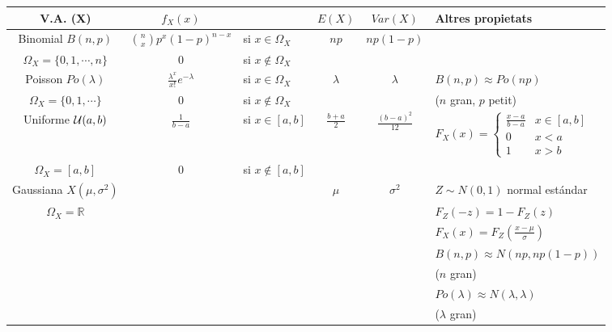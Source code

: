 \documentclass[a4paper,10pt]{article}
\begin{document}
\begin{tabular}{|c|cl|c|c|l|}
V.A. (X) & $f_X(x)$ & & $E(X)$ & $Var(X)$ & Altres propietats \\
\hline
Binomial $B(n, p)$ & $\binom{n}{x} p^x (1-p)^{n-x}$ & si $x\in \Omega_X$ &
 $np$ & $np(1-p)$ & \\
$\Omega_X=\{ 0, 1, \cdots, n \}$ & $0$ & si $x \notin \Omega_X$ & & & \\ \hline
Poisson $Po(\lambda)$ & $\frac{\lambda^x}{x!} e^{-\lambda}$ & si $x\in \Omega_X$ & 
 $\lambda$ & $\lambda$ & $B(n, p) \approx Po(np)$ \\
$\Omega_X=\{ 0, 1, \cdots \}$ & $0$ & si $x \notin \Omega_X$ & & & ($n$ gran, $p$ petit)\\ \hline
Uniforme ${\cal U}(a, b)$ & $\frac{1}{b-a}$ & si $x \in [a, b]$ & 
$\frac{b+a}{2}$ & $\frac{(b-a)^2}{12}$ & 
$F_X(x)=\begin{cases} 
\frac{x-a}{b-a} & x \in [a, b] \\
0 & x < a \\
1 & x > b
\end{cases}$ \\
$\Omega_X=[a, b]$ & 0 & si $x \notin [a, b]$ &  & & \\ \hline
Gaussiana $X(\mu, \sigma^2)$ & & & $\mu$ & $\sigma^2$ & $Z\sim N(0, 1)$ normal est\'andar \\
$\Omega_X=\mathbb{R}$ & & & &  & $F_Z(-z)=1-F_Z(z)$ \\
 & & & &  & $F_X(x)=F_Z(\frac{x-\mu}{\sigma})$ \\ 
 & & & &  & $B(n, p) \approx N(np, np(1-p))$ \\ 
 & & & &  & ($n$ gran) \\
 & & & &  & $Po(\lambda) \approx N(\lambda, \lambda)$ \\ 
 & & & &  & ($\lambda$ gran) \\ \hline
\end{tabular}
\end{document}

